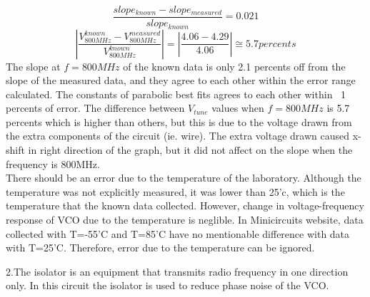 \begin{equation}
    \frac{slope_{known}-slope_{measured}}{slope_{known}}=0.021
\end{equation}
\begin{equation}
    \left | \frac{V_{800MHz}^{known}-V_{800MHz}^{measured}}{V_{800MHz}^{known}} \right |=\left | \frac{4.06-4.29}{4.06} \right |\cong 5.7 percents
\end{equation}
The slope at $f=800MHz$ of the known data is only 2.1 percents off from the slope of the measured data, and they agree to each other within the error range calculated. 
The constants of parabolic best fits agrees to each other within ~1 percents of error. 
The difference between $V_{tune}$ values when $f=800MHz$ is 5.7 percents which is higher than others, but this is due to the voltage drawn from the extra components of the circuit (ie. wire). The extra voltage drawn caused x-shift in right direction of the graph, but it did not affect on the slope when the frequency is 800MHz. \\
There should be an error due to the temperature of the laboratory. Although the temperature was not explicitly measured, it was lower than 25'c, which is the temperature that the known data collected. However, change in voltage-frequency response of VCO due to the temperature is neglible. In Minicircuits website, data collected with T=-55'C and T=85'C have no mentionable difference with data with T=25'C. Therefore, error due to the temperature can be ignored.

2.The isolator is an equipment that transmits radio frequency in one direction only. In this circuit the isolator is used to reduce phase noise of the VCO.